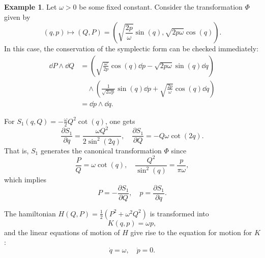 \documentclass[english,fontsize=11pt,paper=b5]{scrbook}
\theoremstyle{definition}
\newtheorem{example}{Example}[chapter]
\begin{document}
    \begin{example}\label{ex:integrabilityho}
      Let $\omega > 0$ be some fixed constant.
      Consider the transformation $\Phi$ given by
      \begin{equation}
        (q,p) \mapsto (Q,P) = \left(
          \sqrt{\frac{2p}{\omega}} \sin(q),
          \sqrt{2p\omega}\cos(q)
        \right).
      \end{equation}
      In this case, the conservation of the symplectic form can be checked immediately:
      \begin{align}
        \dd P\wedge \dd Q & =
        \left(\sqrt{\frac{\omega}{2 p}}\cos(q)\dd p - \sqrt{2 p\omega} \sin(q)\dd q\right)           \\
                          & \quad\wedge
                          \left(\frac{1}{\sqrt{2\omega p}}\sin(q)\dd p + \sqrt{\frac{2 p}{\omega}} \cos(q)\dd q\right) \\
                          & = \dd p \wedge \dd q.
      \end{align}

      For $S_1(q,Q) = -\frac{\omega}{2}Q^2\cot(q)$, one gets
      \begin{equation}
        \frac{\partial S_1}{\partial q} = \frac{\omega Q^2}{2\sin^2(2q)}, \quad
        \frac{\partial S_1}{\partial Q} = - Q\omega \cot(2q).
      \end{equation}
      That is, $S_1$ generates the canonical transformation $\Phi$ since
      \begin{equation}
        \frac{P}{Q} = \omega\cot(q), \quad
        \frac{Q^2}{\sin^2(q)} = \frac{p}{\pi\omega},
      \end{equation}
      which implies
      \begin{equation}
        P = -\frac{\partial S_1}{\partial Q}, \quad
        p = \frac{\partial S_1}{\partial q}.
      \end{equation}

      The hamiltonian $H(Q,P) = \frac12 (P^2 + \omega^2 Q^2)$ is transformed into
      \begin{equation}
        K(q,p) = \omega p,
      \end{equation}
      and the linear equations of motion of $H$ give rise to the equation for motion for $K$:
      \begin{equation}
        \dot q = \omega, \quad \dot p = 0.
      \end{equation}
    \end{example}
\end{document}
